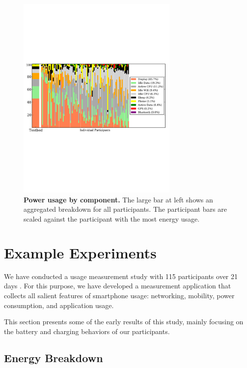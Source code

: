 
\begin{figure}[th!]
\centering
\includegraphics[width=0.7\textwidth]{./figures/power/breakdown/graph.pdf}
\caption{\textbf{Power usage by component.} The large bar at left shows an
aggregated breakdown for all participants. The participant bars are scaled
against the participant with the most energy usage.}
\label{figure-batteryoverview}
\end{figure}

\section{Example Experiments}
\label{sec-usage}

We have conducted a usage measurement study with 115 participants over 21 days
.
For this purpose, we have developed a measurement application that collects all
salient features of smartphone usage: networking, mobility, power consumption,
and application usage.

This section presents some of the early results of this study, mainly focusing
on the battery and charging behaviors of our participants.

\subsection{Energy Breakdown}

